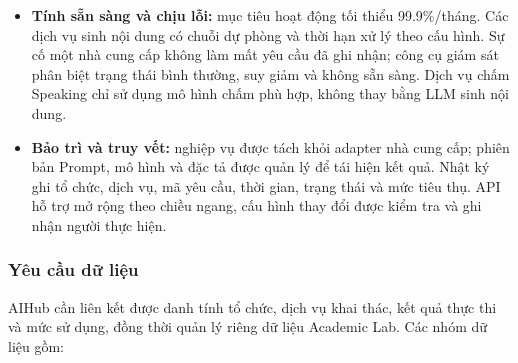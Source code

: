 \begin{itemize}
\item \textbf{Tính sẵn sàng và chịu lỗi:} mục tiêu hoạt động tối thiểu 99.9\%/tháng. Các dịch vụ sinh nội dung có chuỗi dự phòng và thời hạn xử lý theo cấu hình. Sự cố một nhà cung cấp không làm mất yêu cầu đã ghi nhận; công cụ giám sát phân biệt trạng thái bình thường, suy giảm và không sẵn sàng. Dịch vụ chấm Speaking chỉ sử dụng mô hình chấm phù hợp, không thay bằng LLM sinh nội dung.

\item \textbf{Bảo trì và truy vết:} nghiệp vụ được tách khỏi adapter nhà cung cấp; phiên bản Prompt, mô hình và đặc tả được quản lý để tái hiện kết quả. Nhật ký ghi tổ chức, dịch vụ, mã yêu cầu, thời gian, trạng thái và mức tiêu thụ. API hỗ trợ mở rộng theo chiều ngang, cấu hình thay đổi được kiểm tra và ghi nhận người thực hiện.
\end{itemize}

\subsubsection{Yêu cầu dữ liệu}
\label{aihub:subsubsec:aihub_data_requirements}
AIHub cần liên kết được danh tính tổ chức, dịch vụ khai thác, kết quả thực thi và mức sử dụng, đồng thời quản lý riêng dữ liệu Academic Lab. Các nhóm dữ liệu gồm:

